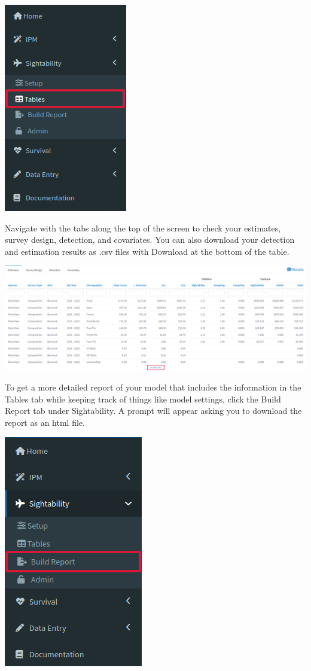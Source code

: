\documentclass[
]{book}
\begin{document}
\includegraphics{./www/sight_walk4.png}

Navigate with the tabs along the top of the screen to check your estimates, survey design, detection, and covariates. You can also download your detection and estimation results as .csv files with {Download} at the bottom of the table.

\includegraphics{./www/sight_walk5.png}

To get a more detailed report of your model that includes the information in the Tables tab while keeping track of things like model settings, click the Build Report tab under Sightability. A prompt will appear asking you to download the report as an html file.

\includegraphics{./www/sight_walk7.png}
\end{document}
